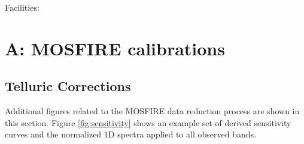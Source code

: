\documentclass[iop]{emulateapj}
\begin{document}
Facilities:  



%


\clearpage
\newpage 


\appendix


\section{A: MOSFIRE calibrations}
\label{sec:MOSFIRE cals}

\subsection{Telluric Corrections}

Additional figures related to the MOSFIRE data reduction process are shown in this section. 
Figure \ref{fig:sensitivity} shows an example set of derived sensitivity curves and the normalized 1D spectra applied to all observed bands. 
\end{document}

